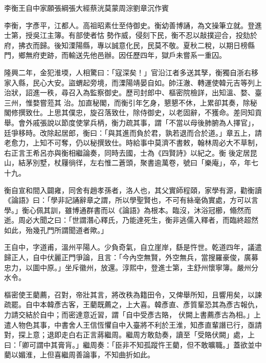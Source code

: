
\begin{pinyinscope}

 李衡王自中家願張綱張大經蔡洸莫蒙周淙劉章沉作賓



 李衡，字彥平，江都人。高祖昭素仕至侍御史。衡幼善博誦，為文操筆立就。登進士第，授吳江主簿。有部使者怙
 勢作威，侵刻下民，衡不忍以敲撲迎合，投劾於府，拂衣而歸。後知溧陽縣，專以誠意化民，民莫不敬。夏秋二稅，以期日榜縣門，鄉無府吏跡，而輸送先他邑辦。因任歷四年，獄戶未嘗系一重囚。



 隆興二年，金犯淮堧，人相驚曰：「寇深矣！」官沿江者多送其孥，衡獨自浙右移家入縣，民心大安。盜蝟起旁境，而溧陽靖晏自如。帥汪澈、轉運使韓元吉等列上治狀，詔進一秩，尋召入為監察御史。歷司封郎中、樞密院檢詳，出知溫、婺、臺三州，惟婺嘗蒞其
 治。加直秘閣，而衡引年乞身，懇懇不休，上累卻其奏，除秘閣修撰致仕。上思其僕忠，旋召落致仕，除侍御史，以老固辭，不獲命。差同知貢舉。會外戚張說以節度使掌兵柄，衡力疏其事，謂「不當以母後肺腑為人擇官」，廷爭移時。改除起居郎，衡曰：「與其進而負於君，孰若退而合於道。」章五上，請老愈力，上知不可奪，仍以秘撰致仕。時給事中莫濟不書敕，翰林周必大不草制，右正言王希呂亦與衡相繼論奏，同時去國，士為《四賢詩》以紀之。衡
 後定居昆山，結茅別墅，杖屨徜徉，左右惟二蒼頭，聚書逾萬卷，號曰「樂庵」，卒，年七十九。



 衡自宣和間入闢雍，同舍有趙孝孫者，洛人也，其父實師程頤，家學有源，勸衡讀《論語》曰：「學非記誦辭章之謂，所以學聖賢也，不可有絲毫偽實處，方可以言學。」衡心佩其訓，雖博通群書而以《論語》為根本。臨沒，沐浴冠櫛，翛然而逝。周必大聞之曰：「世謂潛心釋氏，乃能達死生，衡非逃儒入釋者，而臨終超然如此，殆幾孔門所謂聞道者歟。」



 王自中，字道甫，溫州平陽人。少負奇氣，自立崖岸，繇是忤世。乾道四年，議遣歸正人，自中伏麗正門爭論，且言：「今內空無賢，外空無兵，當搜羅豪俊，廣募忠力，以圖中原。」坐斥徽州，放還。淳熙中，登進士第，主舒州懷寧簿。嚴州分水令。



 樞密使王藺薦，召對，帝壯其言，將改秩為籍田令，又俾舉所知，且響用矣，以諫疏罷。自中本韓彥古客，王藺既薦之，上大喜。韓彥直、彥質輩恐其為彥古報仇，力請交結於自中；而密達意近習，謂「自中受彥古賂，
 伏闕上書薦彥古為相。」上遣人物色其事，中書舍人王信恆懼自中入臺將不利於王淮，知彥直輩譖已行，亟請對，探上意；退即走白右正言蔣繼周。繼周方敢劾奏，讀至「受賂伏闕」處，上曰：「卿可謂中其膏肓。」繼周奏：「臣非不知孤蹤忤王藺，但不敢曠職。」蓋欲並中藺以媚淮，上但喜繼周善論事，不知曲折如此。




\end{pinyinscope}
